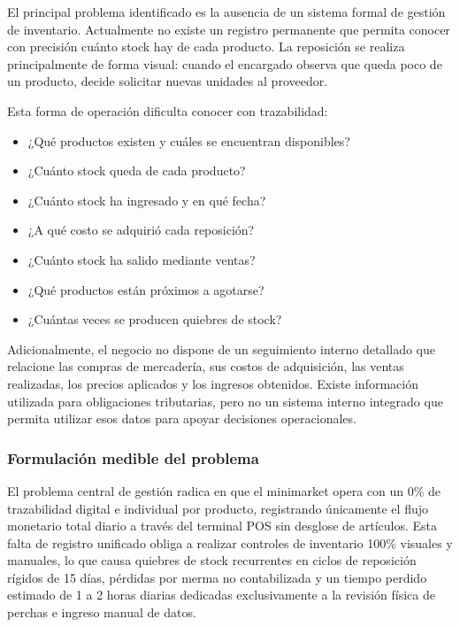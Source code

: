 \documentclass[10pt,a4paper]{article}
\begin{document}
El principal problema identificado es la ausencia de un sistema formal de gestión de inventario. Actualmente no existe un registro permanente que permita conocer con precisión cuánto stock hay de cada producto. La reposición se realiza principalmente de forma visual: cuando el encargado observa que queda poco de un producto, decide solicitar nuevas unidades al proveedor.

Esta forma de operación dificulta conocer con trazabilidad:

\begin{itemize}[leftmargin=*]
    \item ¿Qué productos existen y cuáles se encuentran disponibles?
    \item ¿Cuánto stock queda de cada producto?
    \item ¿Cuánto stock ha ingresado y en qué fecha?
    \item ¿A qué costo se adquirió cada reposición?
    \item ¿Cuánto stock ha salido mediante ventas?
    \item ¿Qué productos están próximos a agotarse?
    \item ¿Cuántas veces se producen quiebres de stock?
\end{itemize}

Adicionalmente, el negocio no dispone de un seguimiento interno detallado que relacione las compras de mercadería, sus costos de adquisición, las ventas realizadas, los precios aplicados y los ingresos obtenidos. Existe información utilizada para obligaciones tributarias, pero no un sistema interno integrado que permita utilizar esos datos para apoyar decisiones operacionales.

\subsubsection{Formulación medible del problema}

El problema central de gestión radica en que el minimarket opera con un 0\% de trazabilidad digital e individual por producto, registrando únicamente el flujo monetario total diario a través del terminal POS sin desglose de artículos. Esta falta de registro unificado obliga a realizar controles de inventario 100\% visuales y manuales, lo que causa quiebres de stock recurrentes en ciclos de reposición rígidos de 15 días, pérdidas por merma no contabilizada y un tiempo perdido estimado de 1 a 2 horas diarias dedicadas exclusivamente a la revisión física de perchas e ingreso manual de datos.
\end{document}
